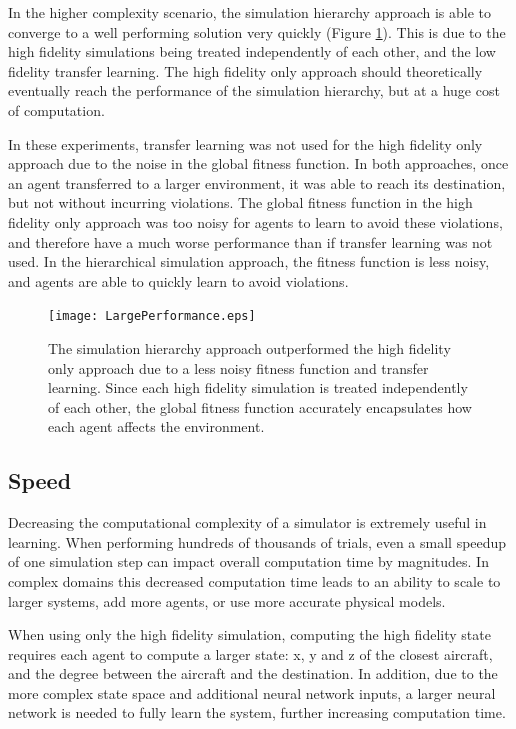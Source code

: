 \documentclass{sig-alternate}
\begin{document}
In the higher complexity scenario, the simulation hierarchy approach is able to converge to a well performing solution very quickly (Figure \ref{fig:60Performance}). This is due to the high fidelity simulations being treated independently of each other, and the low fidelity transfer learning. The high fidelity only approach should theoretically eventually reach the performance of the simulation hierarchy, but at a huge cost of computation.

In these experiments, transfer learning was not used for the high fidelity only approach due to the noise in the global fitness function. In both approaches, once an agent transferred to a larger environment, it was able to reach its destination, but not without incurring violations. The global fitness function in the high fidelity only approach was too noisy for agents to learn to avoid these violations, and therefore have a much worse performance than if transfer learning was not used. In the hierarchical simulation approach, the fitness function is less noisy, and agents are able to quickly learn to avoid violations.

\begin{figure}
\centering
\texttt{[image: LargePerformance.eps]}
\caption{The simulation hierarchy approach outperformed the high fidelity only approach due to a less noisy fitness function and transfer learning. Since each high fidelity simulation is treated independently of each other, the global fitness function accurately encapsulates how each agent affects the environment.}
\label{fig:60Performance}
\end{figure}

\subsection{Speed}

Decreasing the computational complexity of a simulator is extremely useful in learning. When performing hundreds of thousands of trials, even a small speedup of one simulation step can impact overall computation time by magnitudes. In complex domains this decreased computation time leads to an ability to scale to larger systems, add more agents, or use more accurate physical models. 

When using only the high fidelity simulation, computing the high fidelity state requires each agent to compute a larger state: x, y and z of the closest aircraft, and the degree between the aircraft and the destination. In addition, due to the more complex state space and additional neural network inputs, a larger neural network is needed to fully learn the system, further increasing computation time. 
\end{document}
